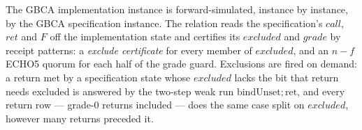 \begin{theorem}
  \label{thm:gbca-inst-refines}
  \leanok
  The GBCA implementation instance is forward-simulated, instance by instance, by the GBCA specification instance.
  The relation reads the specification's $call$, $ret$ and $F$ off the implementation state and certifies its $excluded$ and $grade$ by receipt patterns: a \emph{exclude certificate} for every member of $excluded$, and an $n{-}f$ ECHO5 quorum for each half of the grade guard.
  Exclusions are fired on demand: a return met by a specification state whose $excluded$ lacks the bit that return needs excluded is answered by the two-step weak run $\mathrm{bindUnset};\mathrm{ret}$, and every return row --- grade-0 returns included --- does the same case split on $excluded$, however many returns preceded it.
\end{theorem}

